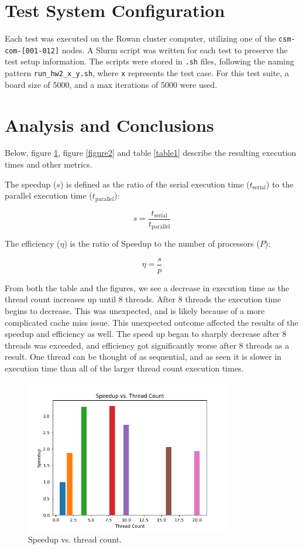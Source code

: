 \documentclass{article}
\begin{document}
	\section{Test System Configuration}
	Each test was executed on the Rowan cluster computer, utilizing one of the \texttt{csm-com-[001-012]} nodes. A Slurm script was written for each test to preserve the test setup information. The scripts were stored in \texttt{.sh} files, following the naming pattern \texttt{run\_hw2\_x\_y.sh}, where \texttt{x} represents the test case. For this test suite, a board size of 5000, and a max iterations of 5000 were used.

	\section{Analysis and Conclusions}
	Below, figure \ref{figure1}, figure \ref{figure2} and table \ref{table1} describe the resulting execution times and other metrics.
	
	The speedup (\(s\)) is defined as the ratio of the serial execution time (\(t_{\text{serial}}\)) to the parallel execution time (\(t_{\text{parallel}}\)):

\[s = \frac{t_{\text{serial}}}{t_{\text{parallel}}}\]

The efficiency (\(\eta\)) is the ratio of Speedup to the number of processors (\(P\)):

\[\eta = \frac{s}{p}\]

From both the table and the figures, we see a decrease in execution time as the thread count increases up until 8 threads. After 8 threads the execution time begins to decrease. This was unexpected, and is likely because of a more complicated cache miss issue. This unexpected outcome affected the results of the speedup and efficiency as well. The speed up began to sharply decrease after 8 threads was exceeded, and efficiency got significantly worse after 8 threads as a result. One thread can be thought of as sequential, and as seen it is slower in execution time than all of the larger thread count execution times.
	
	\begin{figure}
		\centering
		\includegraphics[width=0.8\textwidth]{Figure_1}
		\caption{Speedup vs. thread count.}
		\label{figure1}
	\end{figure}
	
\end{document}
